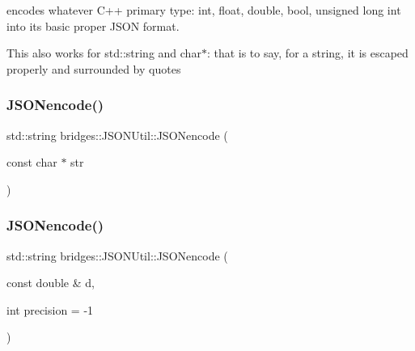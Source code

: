 encodes whatever C++ primary type\+: int, float, double, bool, unsigned long int into its basic proper J\+S\+ON format.

This also works for std\+::string and char$\ast$\+: that is to say, for a string, it is escaped properly and surrounded by quotes \mbox{\label{namespacebridges_1_1_j_s_o_n_util_a6a5122ccf58c08737d70437267674799}} 
\subsubsection{\texorpdfstring{JSONencode()}{JSONencode()}\hspace{0.1cm}{\footnotesize\ttfamily [2/4]}}
{\footnotesize\ttfamily std\+::string bridges\+::\+J\+S\+O\+N\+Util\+::\+J\+S\+O\+Nencode (\begin{DoxyParamCaption}\item[{const char $\ast$}]{str }\end{DoxyParamCaption})\hspace{0.3cm}{\ttfamily [inline]}}

\mbox{\label{namespacebridges_1_1_j_s_o_n_util_aa98c84a92a032c2ab78dbc087d0a0754}} 
\subsubsection{\texorpdfstring{JSONencode()}{JSONencode()}\hspace{0.1cm}{\footnotesize\ttfamily [3/4]}}
{\footnotesize\ttfamily std\+::string bridges\+::\+J\+S\+O\+N\+Util\+::\+J\+S\+O\+Nencode (\begin{DoxyParamCaption}\item[{const double \&}]{d,  }\item[{int}]{precision = {\ttfamily -\/1} }\end{DoxyParamCaption})\hspace{0.3cm}{\ttfamily [inline]}}

\mbox{\label{namespacebridges_1_1_j_s_o_n_util_a661209c42479be511132855fac24cd08}} 
